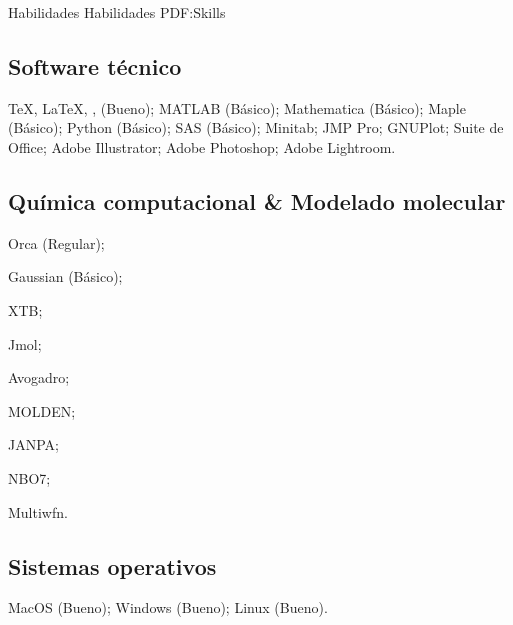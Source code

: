 
\Section
{Habilidades}
{Habilidades}
{PDF:Skills}

\Entry
\subsection*{Software técnico}
{\TeX}, {\LaTeX}, {\XeLaTeX}, (Bueno);
MATLAB (Básico);
Mathematica (Básico);
Maple (Básico);
Python (Básico);
SAS (Básico);
Minitab;
JMP Pro;
GNUPlot;
Suite de Office;
Adobe Illustrator;
Adobe Photoshop;
Adobe Lightroom.

\Entry
\subsection*{Química computacional \& Modelado molecular}
\begin{paralist}
\item Orca (Regular);
\item Gaussian (Básico);
\item XTB;
\item Jmol;
\item Avogadro;
\item MOLDEN;
\item JANPA;
\item NBO7;
\item Multiwfn.
\end{paralist}

\subsection*{Sistemas operativos}
MacOS (Bueno);
Windows (Bueno);
Linux (Bueno).
